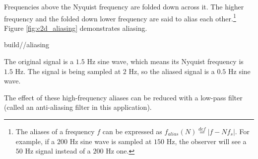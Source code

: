 Frequencies above the Nyquist frequency are folded down across it. The higher
frequency and the folded down lower frequency are said to alias each
other.\footnote{The aliases of a frequency $f$ can be expressed as
$f_{alias}(N) \stackrel{def}{=} |f - Nf_s|$. For example, if a $200$ Hz sine
wave is sampled at $150$ Hz, the \gls{observer} will see a $50$ Hz signal
instead of a $200$ Hz one.} Figure \ref{fig:c2d_aliasing} demonstrates
aliasing.
\begin{svg}{build/\chapterpath/aliasing}
  \caption{The original signal is a $1.5$ Hz sine wave, which means its Nyquist
    frequency is $1.5$ Hz. The signal is being sampled at $2$ Hz, so the aliased
    signal is a $0.5$ Hz sine wave.}
    \label{fig:c2d_aliasing}
\end{svg}

The effect of these high-frequency aliases can be reduced with a low-pass filter
(called an anti-aliasing filter in this application).
